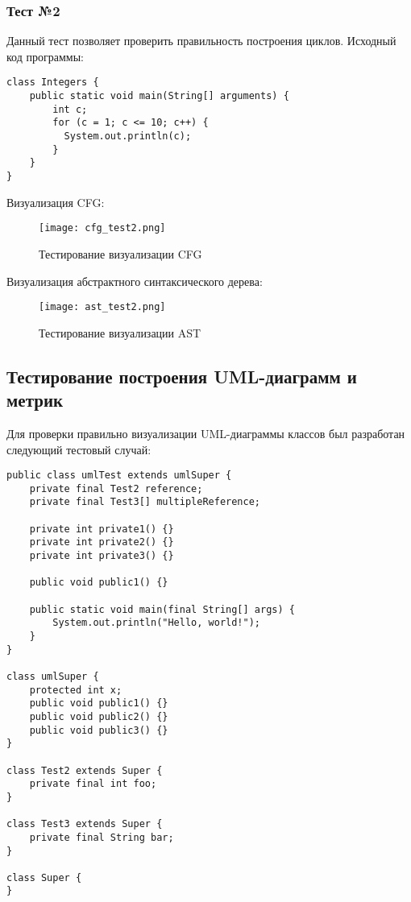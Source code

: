 \subsubsection{Тест №2}

Данный тест позволяет проверить правильность построения циклов. Исходный код
программы:

\begin{lstlisting}
class Integers {
    public static void main(String[] arguments) {
        int c;
        for (c = 1; c <= 10; c++) {
          System.out.println(c);
        }
    }
}
\end{lstlisting}

Визуализация CFG:

\begin{figure}[h]
    \begin{center}
        \texttt{[image: cfg\_test2.png]}
    \end{center}
    \caption{Тестирование визуализации CFG}
    \label{fig:cfg_test2}
\end{figure}

Визуализация абстрактного синтаксического дерева:

\newpage
\begin{figure}[h]
    \begin{center}
        \texttt{[image: ast\_test2.png]}
    \end{center}
    \caption{Тестирование визуализации AST}
    \label{fig:ast_test2}
\end{figure}

\subsection{Тестирование построения UML-диаграмм и метрик}

Для проверки правильно визуализации UML-диаграммы классов был разработан
следующий тестовый случай:

\begin{lstlisting}
public class umlTest extends umlSuper {
    private final Test2 reference;
    private final Test3[] multipleReference;

    private int private1() {}
    private int private2() {}
    private int private3() {}

    public void public1() {}

    public static void main(final String[] args) {
        System.out.println("Hello, world!");
    }
}

class umlSuper {
    protected int x;
    public void public1() {}
    public void public2() {}
    public void public3() {}
}

class Test2 extends Super {
    private final int foo;
}

class Test3 extends Super {
    private final String bar;
}

class Super {
}
\end{lstlisting}

